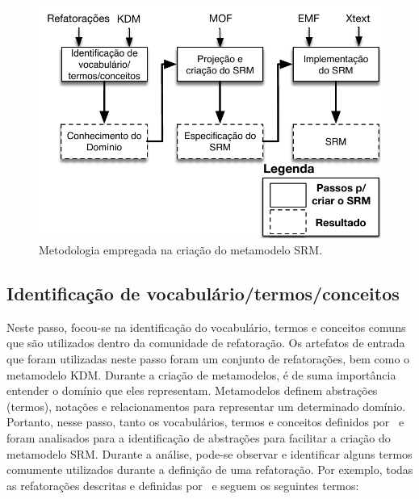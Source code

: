 \begin{figure}[h]
	\centering
	\caption{Metodologia empregada na criação do metamodelo SRM.}
	\label{fig:etapas_da_fase_de_e_do_SRM}
	\includegraphics[scale=0.65]{images/metodologiaParaCriarOSRM2}
	\fautor
\end{figure}



\subsection{Identificação de vocabulário/termos/conceitos}

Neste passo, focou-se na identificação do vocabulário, termos e conceitos comuns que são utilizados dentro da comunidade de refatoração. Os artefatos de entrada que foram utilizadas neste passo foram um conjunto de refatorações, bem como o metamodelo KDM. Durante a criação de metamodelos, é de suma importância entender o domínio que eles representam. Metamodelos definem abstrações (termos), notações e relacionamentos para representar um determinado domínio. Portanto, nesse passo, tanto os vocabulários, termos e conceitos definidos por~ e  foram analisados para a identificação de abstrações para facilitar a criação do metamodelo SRM. Durante a análise, pode-se observar e identificar alguns termos comumente utilizados durante a definição de uma refatoração. Por exemplo, todas as refatorações descritas e definidas por~ e  seguem os seguintes termos: 

